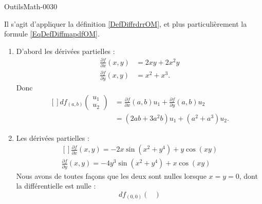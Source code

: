 
\begin{corrige}{OutilsMath-0030}

    Il s'agit d'appliquer la définition \ref{DefDiffrdrrOM}, et plus particulièrement la formule \eqref{EqDefDiffmapdfOM}.
    \begin{enumerate}
        \item
            D'abord les dérivées partielles :
            \begin{subequations}
                \begin{align}
                    \frac{ \partial f }{ \partial x }(x,y)&=2xy+2x^2y\\
                    \frac{ \partial f }{ \partial y }(x,y)&=x^2+x^3.
                \end{align}
            \end{subequations}
            Donc
            \begin{equation}
                \begin{aligned}[]
                    df_{(a,b)}\begin{pmatrix}
                        u_1    \\ 
                        u_2    
                    \end{pmatrix}&=\frac{ \partial f }{ \partial x }(a,b)u_1+\frac{ \partial f }{ \partial y }(a,b)u_2\\
                    &=(2ab+3a^2b)u_1+(a^2+a^3)u_2.
                \end{aligned}
            \end{equation}
        \item
            Les dérivées partielles :
            \begin{equation}
                \begin{aligned}[]
                    \frac{ \partial f }{ \partial x }(x,y)=-2x\sin(x^2+y^4)+y\cos(xy)\\
                    \frac{ \partial f }{ \partial y }(x,y)=-4y^3\sin(x^2+y^4)+x\cos(xy)
                \end{aligned}
            \end{equation}
            Nous avons de toutes façons que les deux sont nulles lorsque $x=y=0$, dont la différentielle est nulle :
            \begin{equation}
                df_{(0,0)}\begin{pmatrix}

\end{pmatrix}
\end{equation}
\end{enumerate}
\end{corrige}
